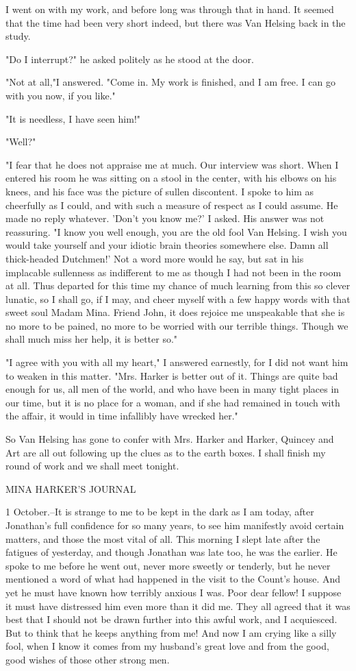 I went on with my work, and before long was through that in hand. It seemed that the time had been very short indeed, but there was Van Helsing back in the study. 

"Do I interrupt?" he asked politely as he stood at the door. 

"Not at all,"I answered. "Come in. My work is finished, and I am free. I can go with you now, if you like." 

"It is needless, I have seen him!" 

"Well?" 

"I fear that he does not appraise me at much. Our interview was short. When I entered his room he was sitting on a stool in the center, with his elbows on his knees, and his face was the picture of sullen discontent. I spoke to him as cheerfully as I could, and with such a measure of respect as I could assume. He made no reply whatever. 'Don't you know me?' I asked. His answer was not reassuring. "I know you well enough, you are the old fool Van Helsing. I wish you would take yourself and your idiotic brain theories somewhere else. Damn all thick-headed Dutchmen!' Not a word more would he say, but sat in his implacable sullenness as indifferent to me as though I had not been in the room at all. Thus departed for this time my chance of much learning from this so clever lunatic, so I shall go, if I may, and cheer myself with a few happy words with that sweet soul Madam Mina. Friend John, it does rejoice me unspeakable that she is no more to be pained, no more to be worried with our terrible things. Though we shall much miss her help, it is better so." 

"I agree with you with all my heart," I answered earnestly, for I did not want him to weaken in this matter. "Mrs. Harker is better out of it. Things are quite bad enough for us, all men of the world, and who have been in many tight places in our time, but it is no place for a woman, and if she had remained in touch with the affair, it would in time infallibly have wrecked her." 

So Van Helsing has gone to confer with Mrs. Harker and Harker, Quincey and Art are all out following up the clues as to the earth boxes. I shall finish my round of work and we shall meet tonight. 

MINA HARKER'S JOURNAL 

1 October.--It is strange to me to be kept in the dark as I am today, after Jonathan's full confidence for so many years, to see him manifestly avoid certain matters, and those the most vital of all. This morning I slept late after the fatigues of yesterday, and though Jonathan was late too, he was the earlier. He spoke to me before he went out, never more sweetly or tenderly, but he never mentioned a word of what had happened in the visit to the Count's house. And yet he must have known how terribly anxious I was. Poor dear fellow! I suppose it must have distressed him even more than it did me. They all agreed that it was best that I should not be drawn further into this awful work, and I acquiesced. But to think that he keeps anything from me! And now I am crying like a silly fool, when I know it comes from my husband's great love and from the good, good wishes of those other strong men. 

